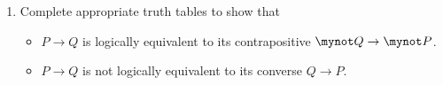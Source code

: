 \begin{previewactivity}
\begin{enumerate}
\item Complete appropriate truth tables to show that
  \begin{itemize}
    \item $P \to Q$   is logically equivalent to its contrapositive $\mynot  Q \to \mynot  P$.
    \item $P \to Q$  is not logically equivalent to its converse  $Q \to P$.
   \end{itemize}
\end{enumerate}
\end{previewactivity}
\hbreak
\endinput
